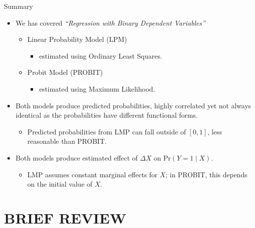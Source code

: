\documentclass[
  10pt,
  ignorenonframetext,
]{beamer}
\providecommand{\tightlist}{%
  \setlength{\itemsep}{0pt}\setlength{\parskip}{0pt}}
\begin{document}
\begin{frame}{Summary}
\protect\hypertarget{summary-1}{}
\begin{itemize}
\tightlist
\item
  We has covered \emph{``Regression with Binary Dependent Variables''}

  \begin{itemize}
  \tightlist
  \item
    Linear Probability Model (LPM)

    \begin{itemize}
    \tightlist
    \item
      estimated using Ordinary Least Squares.
    \end{itemize}
  \item
    Probit Model (PROBIT)

    \begin{itemize}
    \tightlist
    \item
      estimated using Maximum Likelihood.
    \end{itemize}
  \end{itemize}
\end{itemize}

\vspace{0.8mm}

\begin{itemize}
\tightlist
\item
  Both models produce predicted probabilities, highly correlated yet not
  always identical as the probabilities have different functional forms.

  \begin{itemize}
  \tightlist
  \item
    Predicted probabilities from LMP can fall outside of \([0,1]\), less
    reasonable than PROBIT.
  \end{itemize}
\item
  Both models produce estimated effect of \(\Delta{X}\) on
  \(\text{Pr}(Y=1\mid X)\).

  \begin{itemize}
  \tightlist
  \item
    LMP assumes constant marginal effects for \(X\); in PROBIT, this
    depends on the initial value of \(X\).
  \end{itemize}
\end{itemize}
\end{frame}

\hypertarget{brief-review}{%
\section{BRIEF REVIEW}\label{brief-review}}
\end{document}
